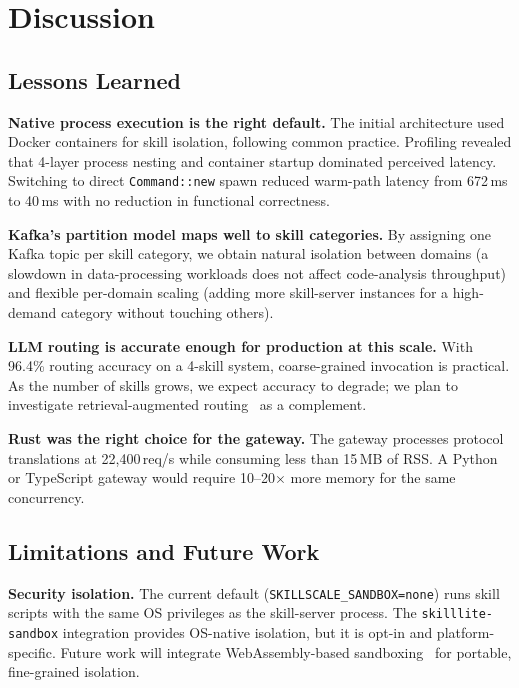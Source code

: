 \documentclass[sigconf,nonacm]{acmart}
\begin{document}
\section{Discussion}
\label{sec:discussion}

\subsection{Lessons Learned}

\textbf{Native process execution is the right default.} The initial architecture used Docker containers for skill isolation, following common practice. Profiling revealed that 4-layer process nesting and container startup dominated perceived latency. Switching to direct \texttt{Command::new} spawn reduced warm-path latency from 672\,ms to 40\,ms with no reduction in functional correctness.

\textbf{Kafka's partition model maps well to skill categories.} By assigning one Kafka topic per skill category, we obtain natural isolation between domains (a slowdown in data-processing workloads does not affect code-analysis throughput) and flexible per-domain scaling (adding more skill-server instances for a high-demand category without touching others).

\textbf{LLM routing is accurate enough for production at this scale.} With 96.4\% routing accuracy on a 4-skill system, coarse-grained invocation is practical. As the number of skills grows, we expect accuracy to degrade; we plan to investigate retrieval-augmented routing~\cite{agentbench2023} as a complement.

\textbf{Rust was the right choice for the gateway.} The gateway processes protocol translations at 22,400\,req/s while consuming less than 15\,MB of RSS. A Python or TypeScript gateway would require 10--20$\times$ more memory for the same concurrency.

\subsection{Limitations and Future Work}

\textbf{Security isolation.} The current default (\texttt{SKILLSCALE\_SANDBOX=none}) runs skill scripts with the same OS privileges as the skill-server process. The \texttt{skilllite-sandbox} integration provides OS-native isolation, but it is opt-in and platform-specific. Future work will integrate WebAssembly-based sandboxing~\cite{wasm2019} for portable, fine-grained isolation.
\end{document}
